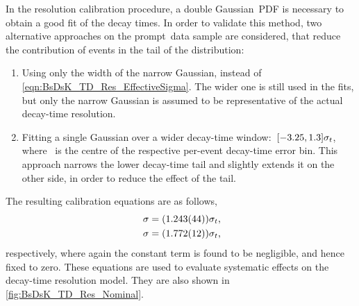 In the resolution calibration procedure, a double Gaussian~PDF is necessary to obtain a good fit of the decay times.
In order to validate this method, two alternative approaches on the prompt~\Ds data sample are considered, that reduce the contribution of events in the tail of the distribution:
%
\begin{enumerate}
    \item Using only the width of the narrow Gaussian, instead of \cref{eqn:BsDsK_TD_Res_EffectiveSigma}.
        The wider one is still used in the fits, but only the narrow Gaussian is assumed to be representative of the actual decay-time resolution.
    \item Fitting a single Gaussian over a wider decay-time window:~\({[-3.25, 1.3]\sigma_{t}}\), where \dt~is the centre of the respective per-event decay-time error bin.
        This approach narrows the lower decay-time tail and slightly extends it on the other side, in order to reduce the effect of the tail.
\end{enumerate}
%
The resulting calibration equations are as follows,
%
\begin{subequations} \label{eqn:BsDsK_TD_Res_Syst}
    \begin{align}
        \sigma = (\num{1.243 +- 0.044}) \dt \rlap{,} \label{eqn:BsDsK_TD_Res_Syst1} \\
        \sigma = (\num{1.772 +- 0.012}) \dt \rlap{,} \label{eqn:BsDsK_TD_Res_Syst2}
    \end{align}
\end{subequations}
%
respectively, where again the constant term is found to be negligible, and hence fixed to zero.
These equations are used to evaluate systematic effects on the decay-time resolution model.
They are also shown in \cref{fig:BsDsK_TD_Res_Nominal}.

\clearpage
